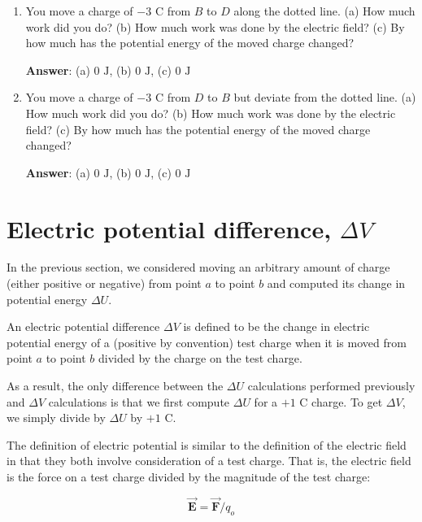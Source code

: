 \documentclass{article}
\newcommand{\bfvec}[1]{\vec{\mathbf{#1}}}
\begin{document}
\begin{enumerate}
  \item You move a charge of $-3\text{ C}$ from $B$ to $D$ along the dotted line. (a) How much work did you do? (b) How much work was done by the electric field? (c) By how much has the potential energy of the moved charge changed?

        \ifsolutions
          \textbf{Answer}: (a) $0\text{ J}$, (b) $0\text{ J}$, (c) $0\text{ J}$
        \else
          \vskip 48pt
        \fi

  \item You move a charge of $-3\text{ C}$ from $D$ to $B$ but deviate from the dotted line. (a) How much work did you do? (b) How much work was done by the electric field? (c) By how much has the potential energy of the moved charge changed?

        \ifsolutions
          \textbf{Answer}: (a) $0\text{ J}$, (b) $0\text{ J}$, (c) $0\text{ J}$
        \fi

\end{enumerate}

\newpage

\section{Electric potential difference, $\Delta V$}

In the previous section, we considered moving an arbitrary amount of charge (either positive or negative) from point $a$ to point $b$ and computed its change in potential energy $\Delta U$. 

An electric potential difference $\Delta V$ is defined to be the change in electric potential energy of a (positive by convention) test charge when it is moved from point $a$ to point $b$ divided by the charge on the test charge.

As a result, the only difference between the $\Delta U$ calculations performed previously and $\Delta V$ calculations is that we first compute $\Delta U$ for a $+1\text{ C}$ charge. To get $\Delta V$, we simply divide by $\Delta U$ by $+1\text{ C}$.

The definition of electric potential is similar to the definition of the electric field in that they both involve consideration of a test charge. That is, the electric field is the force on a test charge divided by the magnitude of the test charge:

\begin{equation}
\bfvec{E} = {\bfvec{F}}/{q_o}
\end{equation}
\end{document}
